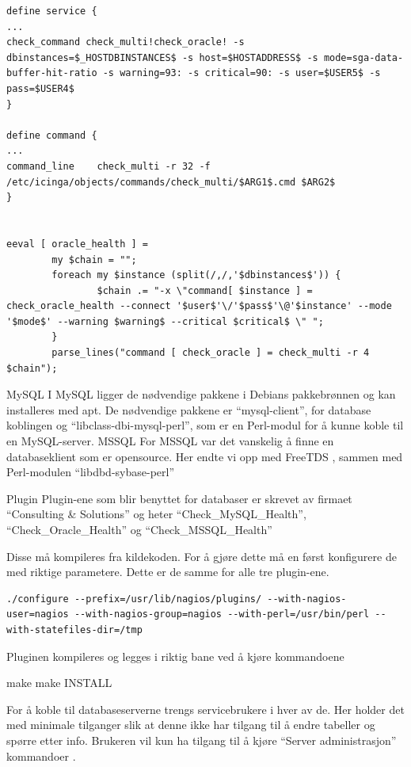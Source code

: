 \begin{lstlisting}
define service {
...
check_command check_multi!check_oracle! -s dbinstances=$_HOSTDBINSTANCES$ -s host=$HOSTADDRESS$ -s mode=sga-data-buffer-hit-ratio -s warning=93: -s critical=90: -s user=$USER5$ -s pass=$USER4$
}

define command {
...
command_line	check_multi -r 32 -f /etc/icinga/objects/commands/check_multi/$ARG1$.cmd $ARG2$
}


eeval [ oracle_health ] =
    	my $chain = "";
    	foreach my $instance (split(/,/,'$dbinstances$')) {
            	$chain .= "-x \"command[ $instance ] = check_oracle_health --connect '$user$'\/'$pass$'\@'$instance' --mode '$mode$' --warning $warning$ --critical $critical$ \" ";
    	}
    	parse_lines("command [ check_oracle ] = check_multi -r 4 $chain");

\end{lstlisting}

MySQL
I MySQL ligger de nødvendige pakkene i Debians pakkebrønnen og kan installeres med apt. De nødvendige pakkene er “mysql-client”, for database koblingen og “libclass-dbi-mysql-perl”, som er en Perl-modul for å kunne koble til en MySQL-server. 
MSSQL
For MSSQL var det vanskelig å finne en databaseklient som er opensource. Her endte vi opp med FreeTDS , sammen med Perl-modulen “libdbd-sybase-perl”

Plugin
Plugin-ene som blir benyttet for databaser er skrevet av firmaet “Consulting \& Solutions” og heter “Check\_MySQL\_Health”, “Check\_Oracle\_Health” og “Check\_MSSQL\_Health” 

Disse må kompileres fra kildekoden. For å gjøre dette må en først konfigurere de med riktige parametere. Dette er de samme for alle tre plugin-ene.

\begin{lstlisting}
./configure --prefix=/usr/lib/nagios/plugins/ --with-nagios-user=nagios --with-nagios-group=nagios --with-perl=/usr/bin/perl --with-statefiles-dir=/tmp
\end{lstlisting}

Pluginen kompileres og legges i riktig bane ved å kjøre kommandoene

make
make INSTALL

For å koble til databaseserverne trengs servicebrukere i hver av de. Her holder det med minimale tilganger slik at denne ikke har tilgang til å endre tabeller og spørre etter info. Brukeren vil kun ha tilgang til å kjøre “Server administrasjon” kommandoer \cite{mysqlpriv}.

